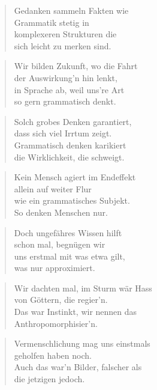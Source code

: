 \documentclass[10pt,a4paper]{article}
\begin{document}
\begin{multicols}{2}
\begin{verse}
Gedanken sammeln Fakten wie \\
Grammatik stetig in \\
komplexeren Strukturen die \\
sich leicht zu merken sind. \\
\end{verse}

\begin{verse}
Wir bilden Zukunft, wo die Fahrt \\
der Auswirkung’n hin lenkt, \\
in Sprache ab, weil uns’re Art \\
so gern grammatisch denkt. \\
\end{verse}

\begin{verse}
Solch grobes Denken garantiert, \\
dass sich viel Irrtum zeigt. \\
Grammatisch denken karikiert \\
die Wirklichkeit, die schweigt. \\
\end{verse}

\begin{verse}
Kein Mensch agiert im Endeffekt \\
allein auf weiter Flur \\
wie ein grammatisches Subjekt. \\
So denken Menschen nur. \\
\end{verse}

\begin{verse}
Doch ungefähres Wissen hilft \\
schon mal, begnügen wir \\
uns erstmal mit was etwa gilt, \\
was nur approximiert. \\
\end{verse}

\begin{verse}
Wir dachten mal, im Sturm wär Hass \\
von Göttern, die regier’n. \\
Das war Instinkt, wir nennen das \\
Anthropomorphisier’n. \\
\end{verse}

\begin{verse}
Vermenschlichung mag uns einstmals \\
geholfen haben noch. \\
Auch das war’n Bilder, falscher als \\
die jetzigen jedoch. \\
\end{verse}


\end{multicols}
\end{document}
